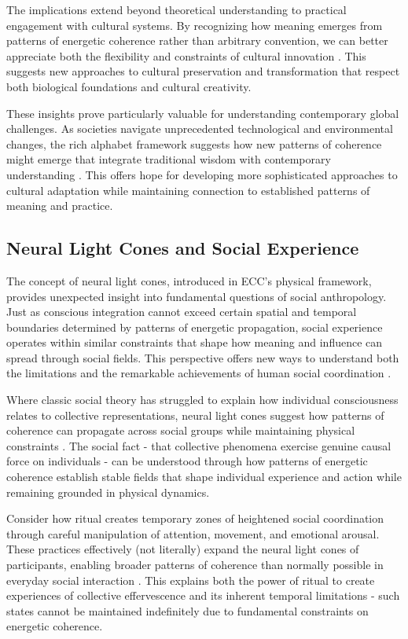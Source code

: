 \begin{refsection}
The implications extend beyond theoretical understanding to practical engagement with cultural systems. By recognizing how meaning emerges from patterns of energetic coherence rather than arbitrary convention, we can better appreciate both the flexibility and constraints of cultural innovation \cite{rappaport1999ritual}. This suggests new approaches to cultural preservation and transformation that respect both biological foundations and cultural creativity.

These insights prove particularly valuable for understanding contemporary global challenges. As societies navigate unprecedented technological and environmental changes, the rich alphabet framework suggests how new patterns of coherence might emerge that integrate traditional wisdom with contemporary understanding \cite{bateson1972steps}. This offers hope for developing more sophisticated approaches to cultural adaptation while maintaining connection to established patterns of meaning and practice.

\subsection{Neural Light Cones and Social Experience}

The concept of neural light cones, introduced in ECC's physical framework, provides unexpected insight into fundamental questions of social anthropology. Just as conscious integration cannot exceed certain spatial and temporal boundaries determined by patterns of energetic propagation, social experience operates within similar constraints that shape how meaning and influence can spread through social fields. This perspective offers new ways to understand both the limitations and the remarkable achievements of human social coordination \cite{durkheim1995elementary}.

Where classic social theory has struggled to explain how individual consciousness relates to collective representations, neural light cones suggest how patterns of coherence can propagate across social groups while maintaining physical constraints \cite{schutz1967phenomenology}. The social fact - that collective phenomena exercise genuine causal force on individuals - can be understood through how patterns of energetic coherence establish stable fields that shape individual experience and action while remaining grounded in physical dynamics.

Consider how ritual creates temporary zones of heightened social coordination through careful manipulation of attention, movement, and emotional arousal. These practices effectively (not literally) expand the neural light cones of participants, enabling broader patterns of coherence than normally possible in everyday social interaction \cite{turner1969ritual}. This explains both the power of ritual to create experiences of collective effervescence and its inherent temporal limitations - such states cannot be maintained indefinitely due to fundamental constraints on energetic coherence.


\end{refsection}
